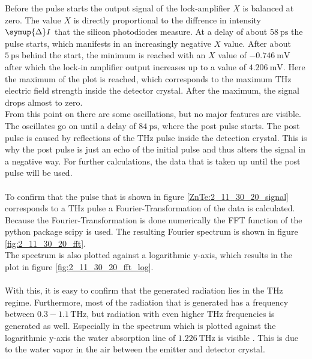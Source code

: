 \FloatBarrier
Before the pulse starts the output signal of the lock-amplifier $X$ is balanced at zero.
The value $X$ is directly proportional to the diffrence in intensity $\symup{\Delta} I$ that the silicon photodiodes measure.
At a delay of about $\SI{58}{\pico\second}$ the pulse starts, which manifests in an increasingly negative $X$ value.
After about $\SI{5}{\pico\second}$ behind the start, the minimum is reached with an $X$ value of $\SI{-0.746}{\milli\V}$ after which the lock-in amplifier output increases up to a value of $\SI{4.206}{\milli\V}$.
Here the maximum of the plot is reached, which corresponds to the maximum $\si{\tera\hertz}$ electric field strength inside the detector crystal.
After the maximum, the signal drops almost to zero.
\\
From this point on there are some oscillations, but no major features are visible. %
The oscillates go on until a delay of $\SI{84}{\pico\second}$, where the post pulse starts.
The post pulse is caused by reflections of the $\si{\tera\hertz}$ pulse inside the detection crystal.
This is why the post pulse is just an echo of the initial pulse and thus alters the signal in a negative way.
For further calculations, the data that is taken up until the post pulse will be used.
\\\\
To confirm that the pulse that is shown in figure \ref{ZnTe:2_11_30_20_signal} corresponds to a $\si{\tera\hertz}$ pulse a Fourier-Transformation of the data is calculated. %
Because the Fourier-Transformation is done numerically the FFT function of the python package scipy \cite{scipy} is used.
The resulting Fourier spectrum is shown in figure \ref{fig:2_11_30_20_fft}.
\\
The spectrum is also plotted against a logarithmic y-axis, which results in the plot in figure \ref{fig:2_11_30_20_fft_log}.
\\\\
With this, it is easy to confirm that the generated radiation lies in the $\si{\tera\hertz}$ regime.
Furthermore, most of the radiation that is generated has a frequency between $0.3-1.1\,\si{\tera\hertz}$, but radiation with even higher $\si{\tera\hertz}$ frequencies is generated as well.
Especially in the spectrum which is plotted against the logarithmic y-axis the water absorption line of $\SI{1.226}{\tera\hertz}$ is visible \cite{water_absorption}.
This is due to the water vapor in the air between the emitter and detector crystal.
